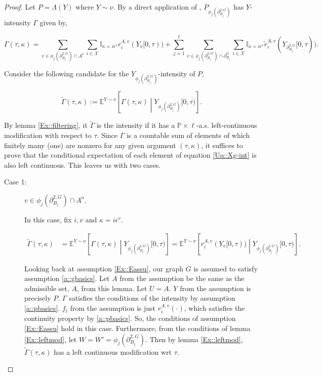 \documentclass[12pt]{article}
\newcommand{\mb}{\mathbb}
\newcommand{\mc}{\mathcal}
\newcommand{\ov}{\overline}
\newcommand{\ep}{\epsilon}
\newcommand{\pr}{\mb{P}}							%
\newcommand{\exmu}[2]{\mb{E}^{#1}\left[#2\right]}	%
\newcommand{\defeq}{:=}								%
\newcommand{\sta}{\mc{X}}							%
\newcommand{\gneigh}[2]{\partial^{#1}_{#2}}			%
\newcommand{\dgneigh}[2]{\partial^{2,#1}_{#2}}		%
\newcommand{\cl}[1]{\ov{#1}}						%
\newcommand{\Sm}{\ell}								%
\newcommand{\rate}{r}								%
\newcommand{\vind}[1]{_{#1}}						%
\newcommand{\tmi}[1]{#1}							%
\newcommand{\stpara}[1]{_{#1}}						%
\newcommand{\gvpara}[2]{^{#1,#2}}					%
\newcommand{\psize}{\ell}							%
\newcommand{\Xg}{Y}									%
\newcommand{\brate}{\alt{\rate}}					%
\newcommand{\inte}[1]{{#1}^\mathrm{o}}				%
\newcommand{\alt}[1]{\tilde{#1}}					%
\newcommand{\pmap}{\Lambda}							%
\newcommand{\rt}{\tau}								%
\renewcommand{\mark}{\kappa}						%
\newcommand{\ratee}{\Gamma}							%
\newcommand{\cratee}{\alt{\ratee}}					%
\newcommand{\rp}{P}									%
\newcommand{\mm}{\nu}								%
\newcommand{\ev}[1]{\ep^{#1}}						%
\begin{document}
\begin{proof}

Let \(\rp = \pmap(\Xg)\) where \(\Xg \sim \mm\). By a direct application of \cite[Exercise 14.7.1]{DalVer08}, \(\rp\vind{\phi_j(\dgneigh{G}{B_j})}\) has \(\Xg\)-intensity \(\ratee\) given by,

\begin{equation}
\ratee(\rt,\mark) = \sum_{v \in\phi_j(\dgneigh{G}{B_j})\cap\inte{A}} \sum_{i \in \sta} \mb{I}_{\mark = i\ev{v}} \rate\gvpara{A}{v}\stpara{i}(\Xg\vind{\cl{v}}\tmi{[0,\rt)}) + \sum_{j = 1}^\psize\sum_{v \in \phi_j(\dgneigh{G}{B_j})\cap\gneigh{G}{B_j}}\sum_{i\in \sta} \mb{I}_{\mark = i\ev{v}} \brate\gvpara{A}{v}\stpara{i}(\Xg\vind{\dgneigh{G}{B_j}}\tmi{[0,\rt)}).
\label{Uq::Xg-int}
\end{equation}

Consider the following candidate for the \(\Xg\vind{\phi_j(\dgneigh{G}{B_j})}\)-intensity of \(\rp\), 

\[\cratee(\rt,\mark) \defeq \exmu{\Xg \sim \mm}{\ratee(\rt,\mark)\middle|\Xg\vind{\phi_j(\dgneigh{G}{B_j})}\tmi{[0,\rt)}}.\]

By lemma \ref{Ex::filtering}, it \(\cratee\) is the intensity if it has a \(\pr\times\Sm\)-a.s. left-continuous modification with respect to \(\rt\). Since \(\ratee\) is a countable sum of elements of which finitely many (one) are nonzero for any given argument \((\rt,\mark)\), it suffices to prove that the conditional expectation of each element of equation \eqref{Uq::Xg-int} is also left continuous. This leaves us with two cases.

\begin{description}
\item[Case 1: ] \(v \in \phi_j(\dgneigh{G}{B_j})\cap\inte{A}\).

In this case, fix \(i,v\) and \(\mark = i\ev{v}\).

\begin{align*}
\cratee(\rt,\mark) &= \exmu{\Xg\sim\mm}{\ratee(\rt,\mark)\middle|\Xg\vind{\phi_j(\dgneigh{G}{B_j})}\tmi{[0,\rt)}} = \exmu{\Xg\sim\mm}{\rate\gvpara{A}{v}\stpara{i}(\Xg\vind{\cl{v}}\tmi{[0,\rt)})\middle|\Xg\vind{\phi_j(\dgneigh{G}{B_j})}\tmi{[0,\rt)}}.
\end{align*}

Looking back at assumption \ref{Ex::Eassu}, our graph \(G\) is assumed to satisfy assumption \ref{a::gbasics}. Let \(A\) from the assumption be the same as the admissible set, \(A\), from this lemma. Let \(U = A\). \(\Xg\) from the assumption is precisely \(\rp\). \(\ratee\) satisfies the conditions of the intensity by assumption \ref{a::pbasics}. \(f_t\) from the assumption is just \(\rate\gvpara{A}{v}\stpara{i}(\cdot)\), which satisfies the continuity property by \ref{a::pbasics}. So, the conditions of assumption \ref{Ex::Eassu} hold in this case. Furthermore, from the conditions of lemma \ref{Ex::leftmod}, let \(W = W' = \phi_j(\dgneigh{G}{B_j})\). Then by lemma \ref{Ex::leftmod}, \(\cratee(\rt,\mark)\) has a left continuous modification wrt \(\rt\).


\end{description}
\end{proof}
\end{document}
